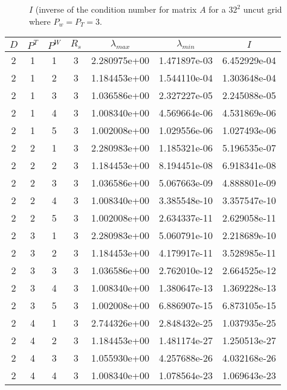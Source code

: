 \documentclass{article}
\begin{document}
\begin{figure}
\centerline{ }
\label{fig::T3W3}
\caption
    {
      $I$ (inverse of the condition number for matrix $A$ for a $32^2$
      uncut grid where $P_w = P_T = 3$.
    }
\end{figure}

\begin{small}
\begin{table}
\begin{center}
\begin{tabular}{|cccc|ccc|} \hline
$D$ & $P^T$  & $P^W$ & $R_s$ & $\lambda_{max}$ & $\lambda_{min}$   & $I$ \\
\hline
2 & 1 & 1 & 3 & 2.280975e+00 & 1.471897e-03 & 6.452929e-04 \\ 
2 & 1 & 2 & 3 & 1.184453e+00 & 1.544110e-04 & 1.303648e-04 \\ 
2 & 1 & 3 & 3 & 1.036586e+00 & 2.327227e-05 & 2.245088e-05 \\ 
2 & 1 & 4 & 3 & 1.008340e+00 & 4.569664e-06 & 4.531869e-06 \\ 
2 & 1 & 5 & 3 & 1.002008e+00 & 1.029556e-06 & 1.027493e-06 \\ 
2 & 2 & 1 & 3 & 2.280983e+00 & 1.185321e-06 & 5.196535e-07 \\ 
2 & 2 & 2 & 3 & 1.184453e+00 & 8.194451e-08 & 6.918341e-08 \\ 
2 & 2 & 3 & 3 & 1.036586e+00 & 5.067663e-09 & 4.888801e-09 \\ 
2 & 2 & 4 & 3 & 1.008340e+00 & 3.385548e-10 & 3.357547e-10 \\ 
2 & 2 & 5 & 3 & 1.002008e+00 & 2.634337e-11 & 2.629058e-11 \\ 
2 & 3 & 1 & 3 & 2.280983e+00 & 5.060791e-10 & 2.218689e-10 \\ 
2 & 3 & 2 & 3 & 1.184453e+00 & 4.179917e-11 & 3.528985e-11 \\ 
2 & 3 & 3 & 3 & 1.036586e+00 & 2.762010e-12 & 2.664525e-12 \\ 
2 & 3 & 4 & 3 & 1.008340e+00 & 1.380647e-13 & 1.369228e-13 \\ 
2 & 3 & 5 & 3 & 1.002008e+00 & 6.886907e-15 & 6.873105e-15 \\ 
2 & 4 & 1 & 3 & 2.744326e+00 & 2.848432e-25 & 1.037935e-25 \\ 
2 & 4 & 2 & 3 & 1.184453e+00 & 1.481174e-27 & 1.250513e-27 \\ 
2 & 4 & 3 & 3 & 1.055930e+00 & 4.257688e-26 & 4.032168e-26 \\ 
2 & 4 & 4 & 3 & 1.008340e+00 & 1.078564e-23 & 1.069643e-23 \\ 

\end{tabular}
\end{center}
\end{table}
\end{small}
\end{document}
